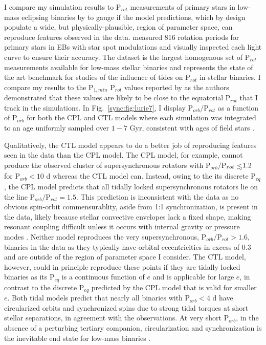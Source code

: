 I compare my simulation results to P$_{rot}$ measurements of primary stars in \kepler low-mass eclipsing binaries by \citet{Lurie2017} to gauge if the model predictions, which by design populate a wide, but physically-plausible, region of parameter space, can reproduce features observed in the data.  \citet{Lurie2017} measured 816 rotation periods for primary stars in \kepler EBs with star spot modulations and visually inspected each light curve to ensure their accuracy. The \citet{Lurie2017} dataset is the largest homogenous set of P$_{rot}$ measurements available for low-mass stellar binaries and represents the state of the art benchmark for studies of the influence of tides on P$_{rot}$ in stellar binaries. I compare my results to the P$_{1,min}$ P$_{rot}$ values reported by \citet{Lurie2017} as the authors demonstrated that these values are likely to be close to the equatorial P$_{rot}$ that I track in the simulations. In Fig.~\ref{sync:fig:lurie7}, I display P$_{orb}/$P$_{rot}$ as a function of P$_{orb}$ for both the CPL and CTL models where each simulation was integrated to an age uniformly sampled over $1-7$ Gyr, consistent with ages of \kepler field stars \citep{Chaplin2014}. 

Qualitatively, the CTL model appears to do a better job of reproducing features seen in the \citet{Lurie2017} data than the CPL model. The CPL model, for example, cannot produce the observed cluster of supersynchronous rotators with P$_{orb}/$P$_{rot} \lsim 1.2$ for P$_{orb} < 10$ d whereas the CTL model can. Instead, owing to the its discrete P$_{eq}$, the CPL model predicts that all tidally locked supersynchronous rotators lie on the line P$_{orb}/$P$_{rot} = 1.5$. This prediction is inconsistent with the data as no obvious spin-orbit commensurablity, aside from 1:1 synchronization, is present in the \citet{Lurie2017} data, likely because stellar convective envelopes lack a fixed shape, making resonant coupling difficult unless it occurs with internal gravity or pressure modes \citep{Burkart2014,Lurie2017}. Neither model reproduces the very supersynchronous, P$_{orb}/$P$_{rot} > 1.6$, binaries in the \citet{Lurie2017} data as they typically have orbital eccentricities in excess of 0.3 and are outside of the region of parameter space I consider. The CTL model, however, could in principle reproduce these points if they are tidally locked binaries as its P$_{eq}$ is a continuous function of $e$ and is applicable for large $e$, in contrast to the discrete P$_{eq}$ predicted by the CPL model that is valid for smaller $e$. Both tidal models predict that nearly all binaries with P$_{orb} < 4$ d have circularized orbits and synchronized spins due to strong tidal torques at short stellar separations, in agreement with the \citet{Lurie2017} observations. At very short P$_{orb}$, in the absence of a perturbing tertiary companion, circularization and synchronization is the inevitable end state for low-mass binaries \citep{Counselman1973}. 

